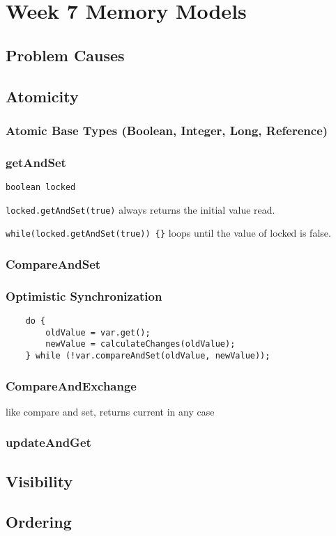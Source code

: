 \section{Week 7 Memory Models}

\subsection{Problem Causes}

\subsection{Atomicity}

\subsubsection*{Atomic Base Types (Boolean, Integer, Long, Reference)}

\subsubsection*{getAndSet}
\verb|boolean locked|

\verb|locked.getAndSet(true)| always returns the initial value read.

\verb|while(locked.getAndSet(true)) {}| loops until the value of locked is false.

\subsubsection*{CompareAndSet}

\subsubsection{Optimistic Synchronization}
\begin{verbatim}
    do {
        oldValue = var.get();
        newValue = calculateChanges(oldValue);
    } while (!var.compareAndSet(oldValue, newValue));
\end{verbatim}

\subsubsection*{CompareAndExchange}
like compare and set, returns current in any case

\subsubsection*{updateAndGet}


\subsection{Visibility}

\subsection{Ordering}